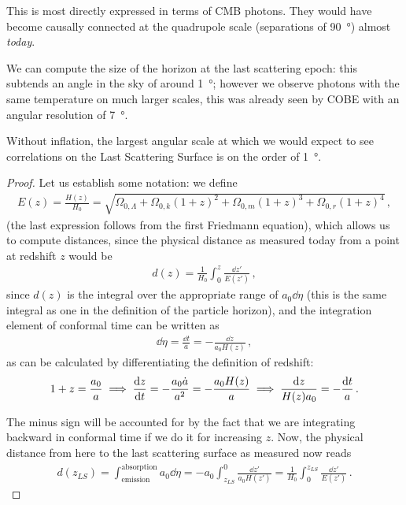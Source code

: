 \documentclass[main.tex]{subfiles}
\begin{document}
This is most directly expressed in terms of CMB photons. They would have become causally connected at the quadrupole scale (separations of \SI{90}{\degree}) almost \emph{today}. 

We can compute the size of the horizon at the last scattering epoch: this subtends an angle in the sky of around \SI{1}{\degree}; however we observe photons with the same temperature on much larger scales, this was already seen by COBE with an angular resolution of \SI{7}{\degree}. 

\begin{claim}
Without inflation, the largest angular scale at which we would expect to see correlations on the Last Scattering Surface is on the order of \SI{1}{\degree}.
\end{claim}

\begin{proof}
Let us establish some notation: we define 
%
\begin{align}
E(z) = \frac{H(z)}{H_0 } = \sqrt{\Omega_{0, \Lambda } + \Omega_{0, k} (1+ z)^2 + \Omega_{0, m} (1 + z)^3 + \Omega_{0, r} (1 + z)^{4}}
\,,
\end{align}
%
(the last expression follows from the first Friedmann equation), which allows us to compute distances, since the physical distance as measured today from a point at redshift \(z\) would be 
%
\begin{align}
d (z) = \frac{1}{H_0 } \int_{0}^{z} \frac{ \dd{z'}}{E(z')}
\,,
\end{align}
%
since \(d(z)\) is the integral over the appropriate range of \(a_0 \dd{\eta }\) (this is the same integral as one in the definition of the particle horizon), and the integration element of conformal time can be written as 
%
\begin{align}
\dd{\eta } = \frac{ \dd{t}}{a} = - \frac{ \dd{z}}{a_0 H(z)}
\,,
\end{align}
%
as can be calculated by differentiating the definition of redshift:
%
\begin{align}
1 + z = \frac{a_0 }{a } 
\implies
\dv{z}{t} = - \frac{a_0 \dot{a}}{a^2} = - \frac{a_0 H(z)}{a} 
\implies 
\frac{ \dd{z}}{H(z) a_0 } = -\frac{ \dd{t}}{a}
\,.
\end{align}

The minus sign will be accounted for by the fact that we are integrating backward in conformal time if we do it for increasing \(z\).
Now, the physical distance from here to the last scattering surface as measured now reads 
%
\begin{align}
d(z_{LS}) = \int_{\text{emission}}^{\text{absorption}} a_0 \dd{\eta }
= -a_0  \int_{z_{LS}}^{0} \frac{ \dd{z'}}{a_0 H(z')} = \frac{1}{H_0 } \int_{0}^{z_{LS}} \frac{ \dd{z'}}{E(z')}
\,.
\end{align}


\end{proof}
\end{document}

